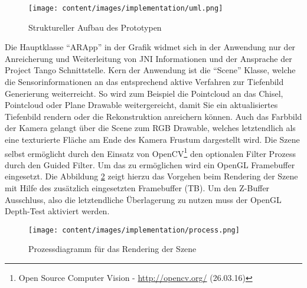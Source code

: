 \begin{figure}[h]
  \centering
	\texttt{[image: content/images/implementation/uml.png]} 
  \caption{Struktureller Aufbau des Prototypen}
  \label{fig:structure}
\end{figure}

Die Hauptklasse \enquote{ARApp} in der Grafik widmet sich in der Anwendung nur der Anreicherung und Weiterleitung von JNI Informationen und der Ansprache der Project Tango Schnittstelle. Kern der Anwendung ist die \enquote{Scene} Klasse, welche die Sensorinformationen an das entsprechend aktive Verfahren zur Tiefenbild Generierung weiterreicht. So wird zum Beispiel die Pointcloud an das Chisel, Pointcloud oder Plane Drawable weitergereicht, damit Sie ein aktualisiertes Tiefenbild rendern oder die Rekonstruktion anreichern können. Auch das Farbbild der Kamera gelangt über die Scene zum RGB Drawable, welches letztendlich als eine texturierte Fläche am Ende des Kamera Frustum dargestellt wird. Die Szene selbst ermöglicht durch den Einsatz von OpenCV\footnote{Open Source Computer Vision - \url{http://opencv.org/} (26.03.16)} den optionalen Filter Prozess durch den Guided Filter. Um das zu ermöglichen wird ein OpenGL Framebuffer eingesetzt. Die Abbildung \ref{fig:rendering-process} zeigt hierzu das Vorgehen beim Rendering der Szene mit Hilfe des zusätzlich eingesetzten Framebuffer (TB). Um den Z-Buffer Ausschluss, also die letztendliche Überlagerung zu nutzen muss der OpenGL Depth-Test aktiviert werden.


\begin{figure}[h]
  \centering
	\texttt{[image: content/images/implementation/process.png]} 
  \caption{Prozessdiagramm für das Rendering der Szene}
  \label{fig:rendering-process}
\end{figure}